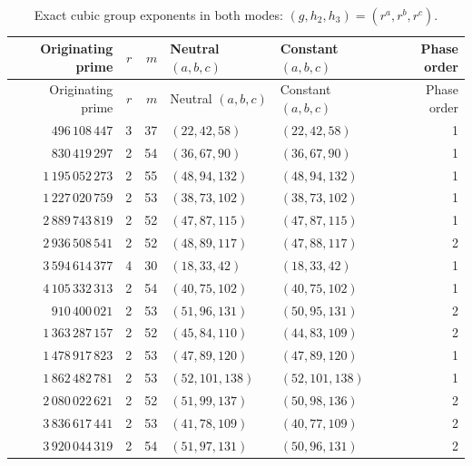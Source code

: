 \documentclass[11pt]{article}
\theoremstyle{definition}\newtheorem{definition}[theorem]{Definition}
\begin{document}
\begin{center}\small\setlength{\tabcolsep}{4pt}
\begin{longtable}{rrrllr}
\caption{Exact cubic group exponents in both modes: $(g,h_2,h_3)=(r^a,r^b,r^c)$.}\label{tab:cubics}\\
\toprule
Originating prime & $r$ & $m$ & Neutral $(a,b,c)$ & Constant $(a,b,c)$ & Phase order \\
\midrule\endfirsthead
\toprule
Originating prime & $r$ & $m$ & Neutral $(a,b,c)$ & Constant $(a,b,c)$ & Phase order \\
\midrule\endhead
$496\,108\,447$ & 3 & 37 & $(22,42,58)$ & $(22,42,58)$ & 1 \\
$830\,419\,297$ & 2 & 54 & $(36,67,90)$ & $(36,67,90)$ & 1 \\
$1\,195\,052\,273$ & 2 & 55 & $(48,94,132)$ & $(48,94,132)$ & 1 \\
$1\,227\,020\,759$ & 2 & 53 & $(38,73,102)$ & $(38,73,102)$ & 1 \\
$2\,889\,743\,819$ & 2 & 52 & $(47,87,115)$ & $(47,87,115)$ & 1 \\
$2\,936\,508\,541$ & 2 & 52 & $(48,89,117)$ & $(47,88,117)$ & 2 \\
$3\,594\,614\,377$ & 4 & 30 & $(18,33,42)$ & $(18,33,42)$ & 1 \\
$4\,105\,332\,313$ & 2 & 54 & $(40,75,102)$ & $(40,75,102)$ & 1 \\
$910\,400\,021$ & 2 & 53 & $(51,96,131)$ & $(50,95,131)$ & 2 \\
$1\,363\,287\,157$ & 2 & 52 & $(45,84,110)$ & $(44,83,109)$ & 2 \\
$1\,478\,917\,823$ & 2 & 53 & $(47,89,120)$ & $(47,89,120)$ & 1 \\
$1\,862\,482\,781$ & 2 & 53 & $(52,101,138)$ & $(52,101,138)$ & 1 \\
$2\,080\,022\,621$ & 2 & 52 & $(51,99,137)$ & $(50,98,136)$ & 2 \\
$3\,836\,617\,441$ & 2 & 53 & $(41,78,109)$ & $(40,77,109)$ & 2 \\
$3\,920\,044\,319$ & 2 & 54 & $(51,97,131)$ & $(50,96,131)$ & 2 \\
\bottomrule\end{longtable}\end{center}


\clearpage
\end{document}
